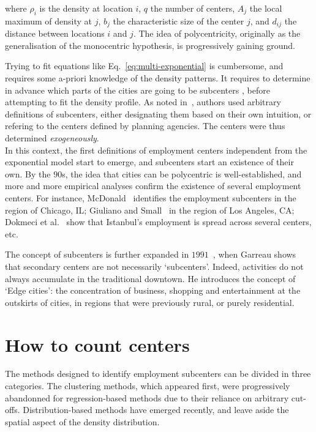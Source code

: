 where $\rho_i$ is the density at location $i$, $q$ the number of centers, $A_j$
the local maximum of density at $j$, $b_j$ the characteristic size of the center
$j$, and $d_{ij}$ the distance between locations $i$ and $j$. The idea of
polycentricity, originally as the generalisation of the monocentric hypothesis,
is progressively gaining ground. 

Trying to fit equations like Eq.~\ref{eq:multi-exponential} is cumbersome, and
requires some a-priori knowledge of the density patterns. It requires to
determine in advance which parts of the cities are going to be subcenters
,
before attempting to fit the density profile. As noted in~\cite{Giuliano:1991},
authors used arbitrary definitions of subcenters, either designating them based
on their own intuition, or refering to the centers defined by planning agencies.
The centers were thus determined \emph{exogeneously}.\\

In this context, the first definitions of employment centers independent from
the exponential model start to emerge, and subcenters start an existence of
their own. By the $90$s, the idea that cities can be polycentric is
well-established, and more and more empirical analyses confirm the existence of
several employment centers. For instance, McDonald~\cite{McDonald:1987} identifies the
employment subcenters in the region of Chicago, IL; Giuliano and Small~\cite{Giuliano:1991} in the
region of Los Angeles, CA; Dokmeci et al.~\cite{Dokmeci:1994} show that Istanbul's employment
is spread across several centers, etc. 

The concept of subcenters is further expanded in $1991$~\cite{Garreau:1991},
when Garreau shows that secondary centers are not necessarily `subcenters'.
Indeed, activities do not always accumulate in the traditional downtown. He
introduces the concept of `Edge cities': the concentration of business, shopping
and entertainment at the outskirts of cities, in regions that were previously
rural, or purely residential.\\


\section{How to count centers}
\label{sec:how_to_measure_polycentrity}

The methods designed to identify employment subcenters can be divided in three
categories. The clustering methods, which appeared first, were progressively
abandonned for regression-based methods due to their reliance on arbitrary
cut-offs. Distribution-based methods have emerged recently, and leave
aside the spatial aspect of the density distribution.


